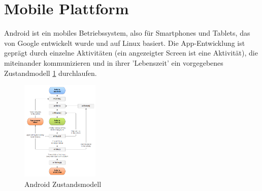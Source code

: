 \section{Mobile Plattform}
\label{sec:grundlagen:plattforml}

Android ist ein mobiles Betriebssystem, also für Smartphones und Tablets, das von Google entwickelt wurde und auf Linux basiert. Die App-Entwicklung ist geprägt durch einzelne Aktivitäten (ein angezeigter Screen ist eine Aktivität), die miteinander kommunizieren und in ihrer 'Lebenszeit' ein vorgegebenes Zustandmodell \ref{figure:androidZustandsmodell} durchlaufen.

\begin{figure}[htp]
	\centering
  	\includegraphics[width=0.33\textwidth]{img/modelle/AndroidZustandsmodell.png}
	\caption[Android Zustandsmodell]{Android Zustandsmodell\protect\footnotemark}
	\label{figure:androidZustandsmodell}
\end{figure}

